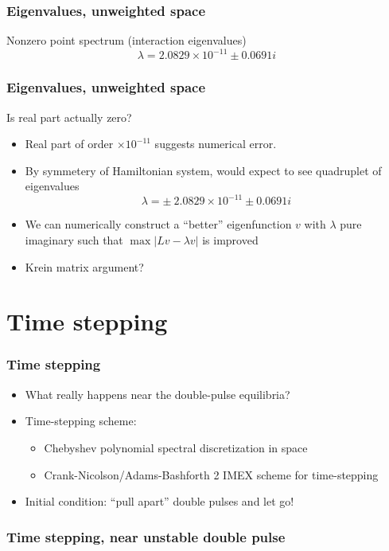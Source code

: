 \documentclass[16pt]{beamer}
\begin{document}
\begin{frame}
	\frametitle{Eigenvalues, unweighted space}
	\fontsize{16}{7.2}\selectfont
	\begin{block}{Nonzero point spectrum (interaction eigenvalues)}
		\[ \lambda = 2.0829 \times 10^{-11} \pm 0.0691i \]
	\end{block}
\end{frame}

\begin{frame}
	\frametitle{Eigenvalues, unweighted space}
	\fontsize{16}{7.2}\selectfont
	Is real part actually zero?
	\begin{itemize}
		\item<1->Real part of order $\times 10^{-11}$ suggests numerical error.
		\item<2->By symmetery of Hamiltonian system, would expect to see quadruplet of eigenvalues
		 \[ \lambda = \pm \: 2.0829 \times 10^{-11} \pm 0.0691i \]
		\item<3-> We can numerically construct a ``better'' eigenfunction $v$ with $\lambda$ pure imaginary such that $\max |Lv - \lambda v|$ is improved
		\item<4-> Krein matrix argument?
	\end{itemize}
\end{frame}

\section{Time stepping}

\begin{frame}
	\frametitle{Time stepping}
	\fontsize{16}{7.2}\selectfont
	\begin{itemize}
		\item<1->What really happens near the double-pulse equilibria?
		\item<2->Time-stepping scheme:
		\begin{itemize}
			\item Chebyshev polynomial spectral discretization in space
			\item Crank-Nicolson/Adams-Bashforth 2 IMEX scheme for time-stepping
		\end{itemize}
		\item<3->Initial condition: ``pull apart'' double pulses and let go!
	\end{itemize}
\end{frame}

\begin{frame}
	\frametitle{Time stepping, near unstable double pulse}
	\fontsize{16}{7.2}\selectfont
	\begin{center}
	\end{center}
\end{frame}
\end{document}
